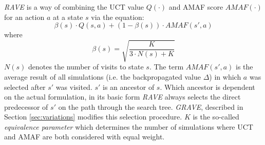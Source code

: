 \textit{RAVE} is a way of combining the UCT value $Q(\cdot)$ and AMAF score $AMAF(\cdot)$ for an action $a$ at a state $s$ via the equation:
\begin{equation}
    \beta(s) \cdot Q(s,a) + (1 - \beta(s)) \cdot AMAF(s',a)
    \label{eq:rave}
\end{equation}
where 
\begin{equation*}
    \beta(s) = \sqrt{\frac{K}{3 \cdot N(s) + K}}
\end{equation*}
$N(s)$ denotes the number of visits to state $s$. The term $AMAF(s',a)$ is the average result of all simulations (i.e. the backpropagated value $\Delta$) in which $a$ was selected after $s'$ was visited. $s'$ is an ancestor of $s$. Which ancestor is dependent on the actual formulation, in its basic form \textit{RAVE} always selects the direct predecessor of $s'$ on the path through the search tree. \textit{GRAVE}, described in Section \ref{sec:variations} modifies this selection procedure. $K$ is the so-called \textit{equivalence parameter} which determines the number of simulations where UCT and AMAF are both considered with equal weight.